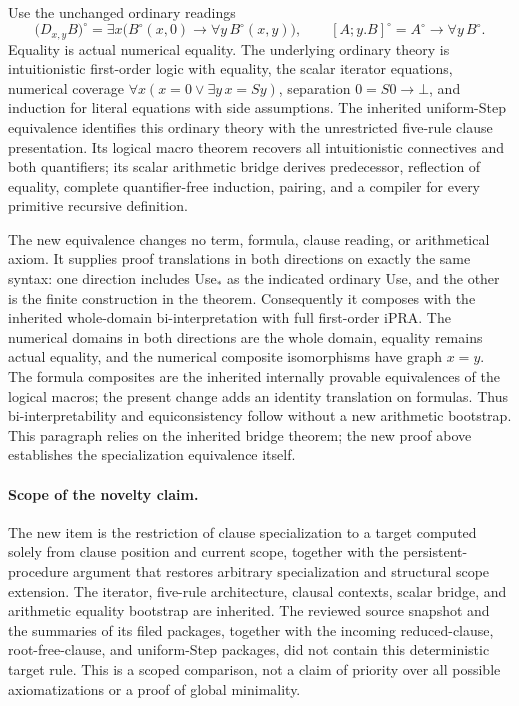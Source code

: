 Use the unchanged ordinary readings
\[
 \bigl(D_{x,y}B\bigr)^\circ
   =\exists x\bigl(B^\circ(x,0)\to\forall y\,B^\circ(x,y)\bigr),
 \qquad
 [A;y.B]^\circ=A^\circ\to\forall y\,B^\circ.
\]
Equality is actual numerical equality.  The underlying ordinary theory is
intuitionistic first-order logic with equality, the scalar iterator
equations, numerical coverage
\(\forall x(x=0\lor\exists y\,x=Sy)\), separation \(0=S0\to\bot\),
and induction for literal equations with side assumptions.  The inherited
uniform-Step equivalence identifies this ordinary theory with the
unrestricted five-rule clause presentation.  Its logical macro theorem
recovers all intuitionistic connectives and both quantifiers; its scalar
arithmetic bridge derives predecessor, reflection of equality, complete
quantifier-free induction, pairing, and a compiler for every primitive
recursive definition.

The new equivalence changes no term, formula, clause reading, or
arithmetical axiom.  It supplies proof translations in both directions on
exactly the same syntax: one direction includes Use$_*$ as the indicated
ordinary Use, and the other is the finite construction in the theorem.
Consequently it composes with the inherited whole-domain bi-interpretation
with full first-order iPRA.  The numerical domains in both directions are
the whole domain, equality remains actual equality, and the numerical
composite isomorphisms have graph \(x=y\).  The formula composites are
the inherited internally provable equivalences of the logical macros;
the present change adds an identity translation on formulas.  Thus
bi-interpretability and equiconsistency follow without a new arithmetic
bootstrap.  This paragraph relies on the inherited bridge theorem; the
new proof above establishes the specialization equivalence itself.

\paragraph{Scope of the novelty claim.}
The new item is the restriction of clause specialization to a target
computed solely from clause position and current scope, together with
the persistent-procedure argument that restores arbitrary specialization
and structural scope extension.  The iterator, five-rule architecture,
clausal contexts, scalar bridge, and arithmetic equality bootstrap are
inherited.  The reviewed source snapshot and the summaries of its filed
packages, together with the incoming reduced-clause, root-free-clause,
and uniform-Step packages, did not contain this deterministic target rule.
This is a scoped comparison, not a claim of priority over all possible
axiomatizations or a proof of global minimality.
